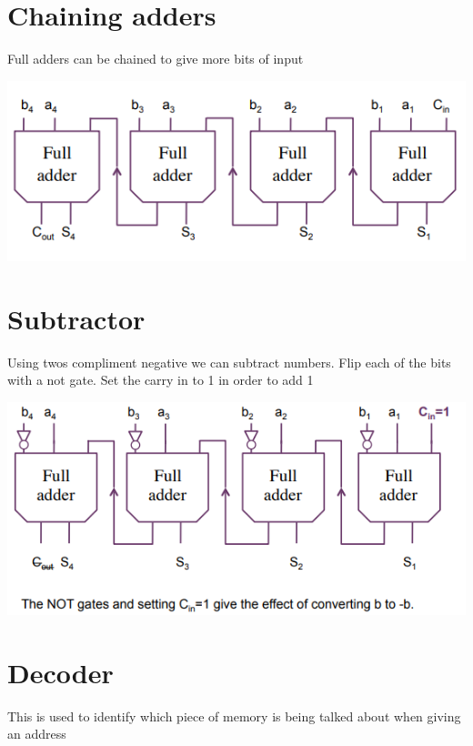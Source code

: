 \documentclass{article}[18pt]
\begin{document}
\section{Chaining adders}
Full adders can be chained to give more bits of input
\begin{center}
	\includegraphics[scale=0.7]{chain_adder}
\end{center}
\section{Subtractor}
Using twos compliment negative we can subtract numbers. Flip each of the bits with a not gate. Set the carry in to 1 in order to add 1
\begin{center}
	\includegraphics[scale=0.7]{subtractor}
\end{center}
\section{Decoder}
This is used to identify which piece of memory is being talked about when giving an address\\
\end{document}
